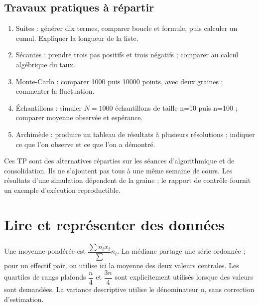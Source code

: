 \subsection*{Travaux pratiques à répartir}\label{TP}
\begin{enumerate}
\item Suites : générer dix termes, comparer boucle et formule, puis calculer un cumul. Expliquer la longueur de la liste.
\item Sécantes : prendre trois pas positifs et trois négatifs ; comparer au calcul algébrique du taux.
\item Monte-Carlo : comparer \num{1000} puis \num{10000} points, avec deux graines ; commenter la fluctuation.
\item Échantillons : simuler $N=\num{1000}$ échantillons de taille n=10 puis n=100 ; comparer moyenne observée et espérance.
\item Archimède : produire un tableau de résultats à plusieurs résolutions ; indiquer ce que l’on observe et ce que l’on a démontré.
\end{enumerate}
Ces TP sont des alternatives réparties sur les séances d’algorithmique et de consolidation. Ils ne s’ajoutent pas tous à une même semaine de cours. Les résultats d’une simulation dépendent de la graine ; le rapport de contrôle fournit un exemple d’exécution reproductible.

\section{Lire et représenter des données}\label{STATS}
Une moyenne pondérée est $\dfrac{\sum n_ix_i}{\sum}n_i$. La médiane partage une série ordonnée ; pour un effectif pair, on utilise ici la moyenne des deux valeurs centrales. Les quartiles de rangs plafonds $\dfrac{n}{4}$ et $\dfrac{3n}{4}$ sont explicitement utilisés lorsque des valeurs sont demandées. La variance descriptive utilise le dénominateur n, sans correction d’estimation.

